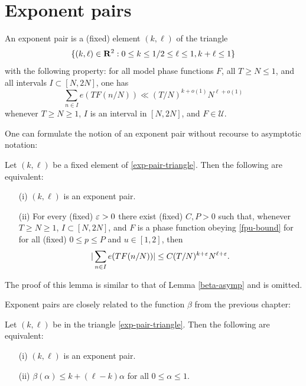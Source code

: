 \chapter{Exponent pairs}\label{exponent-pairs-chapter}

\begin{definition}\label{exp-pair-def}  An exponent pair is a (fixed) element $(k,\ell)$ of the triangle
\begin{equation}\label{exp-pair-triangle}
    \{ (k,\ell) \in \mathbf{R}^2: 0 \leq k \leq 1/2 \leq \ell \leq 1, k+\ell \leq 1 \}
\end{equation}
with the following property: for all model phase functions $F$, all $T \geq N \leq 1$, and all intervals $I \subset [N,2N]$, one has
\begin{equation}\label{ntf}
 \sum_{n \in I} e(T F(n/N)) \ll (T/N)^{k+o(1)} N^{\ell+o(1)}
\end{equation}
whenever $T \geq N \geq 1$, $I$ is an interval in $[N,2N]$, and $F \in {\mathcal U}$.
\end{definition}


One can formulate the notion of an exponent pair without recourse to asymptotic notation:

\begin{lemma}  Let $(k,\ell)$ be a fixed element of \eqref{exp-pair-triangle}.  Then the following are equivalent:
    \begin{itemize}
    \item[(i)] $(k,\ell)$ is an exponent pair.
    \item[(ii)] For every (fixed) $\varepsilon>0$ there exist (fixed) $C, P > 0$ such that, whenever $T \geq N \geq 1$, $I \subset [N,2N]$, and $F$ is a phase function obeying \eqref{fpu-bound} for for all (fixed) $0 \leq p \leq P$ and $u \in [1,2]$, then
    $$ |\sum_{n \in I} e(T F(n/N))| \leq C (T/N)^{k+\varepsilon} N^{\ell+\varepsilon}.$$
   \end{itemize}
\end{lemma}

The proof of this lemma is similar to that of Lemma \ref{beta-asymp} and is omitted.

Exponent pairs are closely related to the function $\beta$ from the previous chapter:

\begin{lemma}\label{beta-duality}  Let $(k,\ell)$ be in the triangle \eqref{exp-pair-triangle}.  Then the following are equivalent:
    \begin{itemize}
    \item[(i)] $(k,\ell)$ is an exponent pair.
    \item[(ii)] $\beta(\alpha) \leq k + (\ell-k)\alpha$ for all $0 \leq \alpha \leq 1$.
    \end{itemize}
    \end{lemma}

